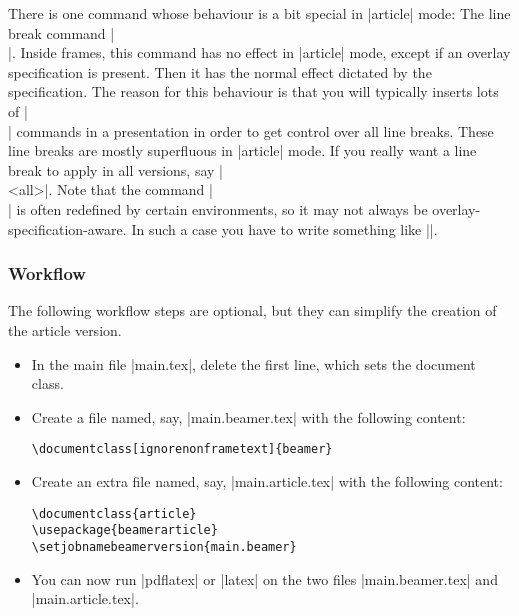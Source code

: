 There is one command whose behaviour is a bit special in |article| mode: The line break command |\\|. Inside frames, this command has no effect in |article| mode, except if an overlay specification is present. Then it has the normal effect dictated by the specification. The reason for this behaviour is that you will typically inserts lots of |\\| commands in a presentation in order to get control over all line breaks. These line breaks are mostly superfluous in |article| mode. If you really want a line break to apply in all versions, say |\\<all>|. Note that the command |\\| is often redefined by certain environments, so it may not always be overlay-specification-aware. In such a case you have to write something like ||.

\subsubsection{Workflow}
\label{section-article-version-workflow}

The following workflow steps are optional, but they can simplify the creation of the article version.

\begin{itemize}
\item
  In the main file |main.tex|, delete the first line, which sets the document class.
\item
  Create a file named, say, |main.beamer.tex| with the following content:

\begin{verbatim}
\documentclass[ignorenonframetext]{beamer}

\end{verbatim}

\item
  Create an extra file named, say, |main.article.tex| with the following content:

\begin{verbatim}
\documentclass{article}
\usepackage{beamerarticle}
\setjobnamebeamerversion{main.beamer}

\end{verbatim}

\item
  You can now run |pdflatex| or |latex| on the two files |main.beamer.tex| and |main.article.tex|.
\end{itemize}

